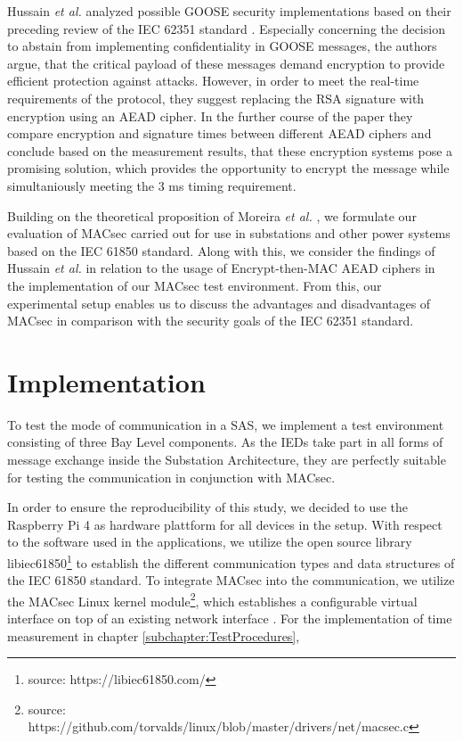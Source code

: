 \documentclass[conference, onecolumn, a4paper]{IEEEtran}
\begin{document}
\smallskip
Hussain \textit{et al.} \cite{GOOSE_confidentiality_integrity:2020} analyzed possible GOOSE security implementations based on their preceding review 
of the IEC 62351 standard \cite{Review_IEC62351:2019}. Especially concerning the decision to abstain from implementing confidentiality in GOOSE messages, 
the authors argue, that the critical payload of these messages demand encryption to provide efficient protection against attacks. However, in order to 
meet the real-time requirements of the protocol, they suggest replacing the RSA signature with encryption using an AEAD cipher. In the further course 
of the paper they compare encryption and signature times between different AEAD ciphers and conclude based on the measurement results, that these encryption 
systems pose a promising solution, which provides the opportunity to encrypt the message while simultaniously  meeting the 3 ms timing requirement.

\smallskip 
Building on the theoretical proposition of Moreira \textit{et al.} \cite{Cybersecurity_Substation:2016}, we formulate our evaluation of MACsec carried 
out for use in substations and other power systems based on the IEC 61850 standard. Along with this, we consider the findings of Hussain \textit{et al.} 
\cite{GOOSE_confidentiality_integrity:2020} in relation to the usage of Encrypt-then-MAC AEAD ciphers in the implementation of our MACsec test environment. 
From this, our experimental setup enables us to discuss the advantages and disadvantages of MACsec in comparison with the security goals of the IEC 62351 
standard. 

\section{Implementation}
\label{chapter:implementation}
\noindent To test the mode of communication in a SAS, we implement a test environment consisting of three Bay Level components. As the IEDs take part 
in all forms of message exchange inside the Substation Architecture, they are perfectly suitable for testing the communication in conjunction with MACsec. 

\smallskip
In order to ensure the reproducibility of this study, we decided to use the Raspberry Pi 4 as hardware plattform for all devices in the setup. With respect 
to the software used in the applications, we utilize the open source library libiec61850\footnote{source: https://libiec61850.com/} to establish the 
different communication types and data structures of the IEC 61850 standard. To integrate MACsec into the communication, we utilize the MACsec Linux kernel 
module\footnote{source: https://github.com/torvalds/linux/blob/master/drivers/net/macsec.c}, which establishes a configurable virtual interface on top of 
an existing network interface \cite{MACsecLinuxModuleDoc:2016}. For the implementation of time measurement in chapter \ref{subchapter:TestProcedures},  
\end{document}
